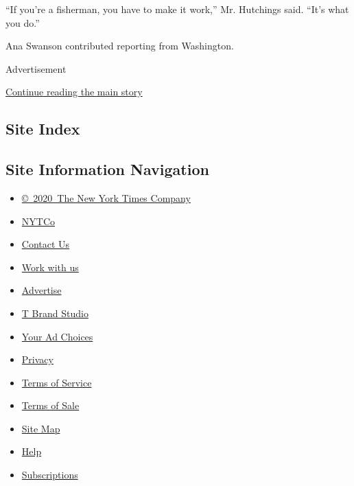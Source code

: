 ``If you're a fisherman, you have to make it work,'' Mr. Hutchings said.
``It's what you do.''

Ana Swanson contributed reporting from Washington.

Advertisement

\protect\hyperlink{after-bottom}{Continue reading the main story}

\hypertarget{site-index}{%
\subsection{Site Index}\label{site-index}}

\hypertarget{site-information-navigation}{%
\subsection{Site Information
Navigation}\label{site-information-navigation}}

\begin{itemize}
\tightlist
\item
  \href{https://help.nytimes3xbfgragh.onion/hc/en-us/articles/115014792127-Copyright-notice}{©~2020~The
  New York Times Company}
\end{itemize}

\begin{itemize}
\tightlist
\item
  \href{https://www.nytco.com/}{NYTCo}
\item
  \href{https://help.nytimes3xbfgragh.onion/hc/en-us/articles/115015385887-Contact-Us}{Contact
  Us}
\item
  \href{https://www.nytco.com/careers/}{Work with us}
\item
  \href{https://nytmediakit.com/}{Advertise}
\item
  \href{http://www.tbrandstudio.com/}{T Brand Studio}
\item
  \href{https://www.nytimes3xbfgragh.onion/privacy/cookie-policy\#how-do-i-manage-trackers}{Your
  Ad Choices}
\item
  \href{https://www.nytimes3xbfgragh.onion/privacy}{Privacy}
\item
  \href{https://help.nytimes3xbfgragh.onion/hc/en-us/articles/115014893428-Terms-of-service}{Terms
  of Service}
\item
  \href{https://help.nytimes3xbfgragh.onion/hc/en-us/articles/115014893968-Terms-of-sale}{Terms
  of Sale}
\item
  \href{https://spiderbites.nytimes3xbfgragh.onion}{Site Map}
\item
  \href{https://help.nytimes3xbfgragh.onion/hc/en-us}{Help}
\item
  \href{https://www.nytimes3xbfgragh.onion/subscription?campaignId=37WXW}{Subscriptions}
\end{itemize}
